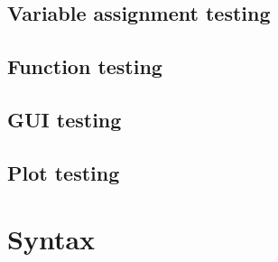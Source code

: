 \documentclass[a4paper, oneside, 11pt]{report}
\begin{document}
\section{Variable assignment testing}\label{sec:variable-assignment-testing}

\section{Function testing}\label{sec:function-testing}

\section{GUI testing}\label{sec:gui-testing}

\section{Plot testing}\label{sec:plot-testing}

\chapter{Syntax}\label{ch:other-stuff}
\end{document}
